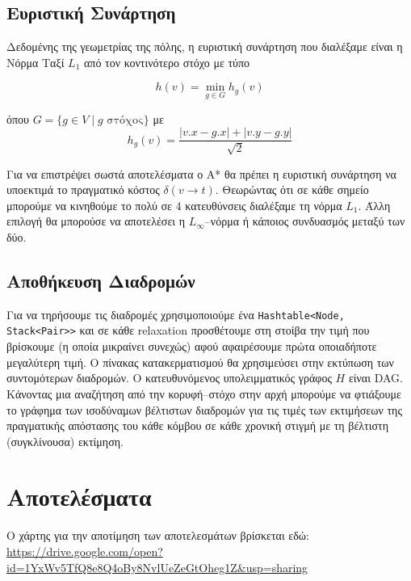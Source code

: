 \documentclass[a4paper,oneside,12pt]{article}
\begin{document}
\subsection{Ευριστική Συνάρτηση}

Δεδομένης της γεωμετρίας της πόλης, η ευριστική συνάρτηση που διαλέξαμε είναι η Νόρμα Ταξί $L_1$ από τον κοντινότερο στόχο με τύπο 

$$h(v) = \min_{g \in G} h_g(v)$$

όπου $G = \{ g \in V \mid g \text{ στόχος} \}$ με $$h_g(v) = \frac {|v.x - g.x | + |v.y - g.y |} {\sqrt 2}$$
 
Για να επιστρέψει σωστά αποτελέσματα ο Α* θα πρέπει η ευριστική συνάρτηση να υποεκτιμά το πραγματικό κόστος $\delta (v \to t)$. Θεωρώντας ότι σε κάθε σημείο μπορούμε να κινηθούμε το πολύ σε 4 κατευθύνσεις διαλέξαμε τη νόρμα $L_1$. Άλλη επιλογή θα μπορούσε να αποτελέσει η $L_\infty$--νόρμα ή κάποιος συνδυασμός μεταξύ των δύο.  

\subsection{Αποθήκευση Διαδρομών} 

Για να τηρήσουμε τις διαδρομές χρησιμοποιούμε ένα \texttt{Hashtable<Node, Stack<Pair>>} και σε κάθε relaxation προσθέτουμε στη στοίβα την τιμή που βρίσκουμε (η οποία μικραίνει συνεχώς) αφού αφαιρέσουμε πρώτα οποιαδήποτε μεγαλύτερη τιμή. Ο πίνακας κατακερματισμού θα χρησιμεύσει στην εκτύπωση των συντομότερων διαδρομών. Ο κατευθυνόμενος υπολειμματικός γράφος $H$ είναι DAG. Κάνοντας μια αναζήτηση από την κορυφή--στόχο στην αρχή μπορούμε να φτιάξουμε το γράφημα των ισοδύναμων βέλτιστων διαδρομών για τις τιμές των εκτιμήσεων της πραγματικής απόστασης του κάθε κόμβου σε κάθε χρονική στιγμή με τη βέλτιστη (συγκλίνουσα) εκτίμηση. 

\section{Αποτελέσματα}

Ο χάρτης για την αποτίμηση των αποτελεσμάτων βρίσκεται εδώ:
\url{https://drive.google.com/open?id=1YxWv5TfQ8e8Q4oBy8NvlUeZeGtOheg1Z&usp=sharing}
\end{document}
